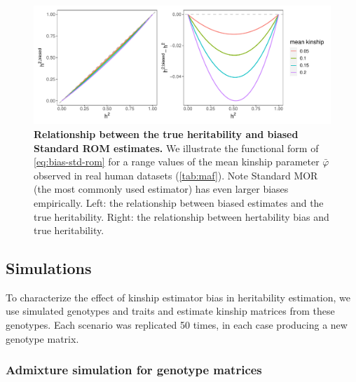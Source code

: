 \documentclass[11pt]{article}
\begin{document}
\begin{figure}[bp!]
  \centering
  \includegraphics[width=\textwidth]{data/Fig_theory.pdf}
  \caption{
    {\bf Relationship between the true heritability and biased Standard ROM estimates.}
    We illustrate the functional form of \cref{eq:bias-std-rom} for a range values of the mean kinship parameter $\bar{\varphi}$ observed in real human datasets (\cref{tab:maf}).
    Note Standard MOR (the most commonly used estimator) has even larger biases empirically.
    Left: the relationship between biased estimates and the true heritability.
    Right: the relationship between hertability bias and true heritability.
    }
  \label{fig:h}
\end{figure}


\subsection{Simulations}
To characterize the effect of kinship estimator bias in heritability estimation, we use simulated genotypes and traits and estimate kinship matrices from these genotypes. Each scenario was replicated 50 times, in each case producing a new genotype matrix.

\subsubsection{Admixture simulation for genotype matrices}
\end{document}
